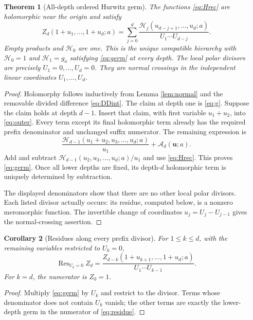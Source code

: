 \documentclass[11pt,a4paper]{article}
\numberwithin{equation}{section}
\newtheorem{theorem}{Theorem}[section]
\newtheorem{corollary}[theorem]{Corollary}
\theoremstyle{definition}\newtheorem{definition}[theorem]{Definition}
\theoremstyle{remark}\newtheorem{remark}[theorem]{Remark}
\DeclareMathOperator{\Res}{Res}
\newcommand{\HH}{\mathcal H}
\newcommand{\Atail}{\mathcal A}
\begin{document}
\begin{theorem}[All-depth ordered Hurwitz germ]\label{thm:germ}
The functions \eqref{eq:Hrec} are holomorphic near the origin and satisfy
\begin{equation}\label{eq:germ}
 \boxed{\displaystyle
 Z_d(1+u_1,\ldots,1+u_d;a)
 =\sum_{j=0}^{d}
   \frac{\HH_j(u_{d-j+1},\ldots,u_d;a)}{U_1\cdots U_{d-j}}.}
\end{equation}
Empty products and $\HH_0$ are one. This is the unique compatible
hierarchy with $\HH_0=1$ and $\HH_1=g_a$ satisfying
\eqref{eq:germ} at every depth. The local polar divisors are precisely
$U_1=0,\ldots,U_d=0$. They are normal crossings in the independent linear
coordinates $U_1,\ldots,U_d$.
\end{theorem}
\begin{proof}
Holomorphy follows inductively from Lemma \ref{lem:normal} and the
removable divided difference \eqref{eq:DDint}. The claim at depth one is
\eqref{eq:g}. Suppose the claim holds at depth $d-1$. Insert that claim,
with first variable $u_1+u_2$, into \eqref{eq:outer}. Every term except
its final holomorphic term already has the required prefix denominator
and unchanged suffix numerator. The remaining expression is
\[
 \frac{\HH_{d-1}(u_1+u_2,u_3,\ldots,u_d;a)}{u_1}
   +\Atail_d(\bm u;a).
\]
Add and subtract $\HH_{d-1}(u_2,u_3,\ldots,u_d;a)/u_1$ and use
\eqref{eq:Hrec}. This proves \eqref{eq:germ}. Once all lower depths are
fixed, its depth-$d$ holomorphic term is uniquely determined by subtraction.

The displayed denominators show that there are no other local polar
divisors. Each listed divisor actually occurs: its residue, computed
below, is a nonzero meromorphic function. The invertible change of
coordinates $u_j=U_j-U_{j-1}$ gives the normal-crossing assertion.
\end{proof}

\begin{corollary}[Residues along every prefix divisor]\label{cor:residue}
For $1\le k\le d$, with the remaining variables restricted to $U_k=0$,
\begin{equation}\label{eq:residue}
 \Res_{U_k=0}Z_d
 =\frac{Z_{d-k}(1+u_{k+1},\ldots,1+u_d;a)}{U_1\cdots U_{k-1}}.
\end{equation}
For $k=d$, the numerator is $Z_0=1$.
\end{corollary}
\begin{proof}
Multiply \eqref{eq:germ} by $U_k$ and restrict to the divisor. Terms
whose denominator does not contain $U_k$ vanish; the other terms are
exactly the lower-depth germ in the numerator of \eqref{eq:residue}.
\end{proof}
\end{document}
